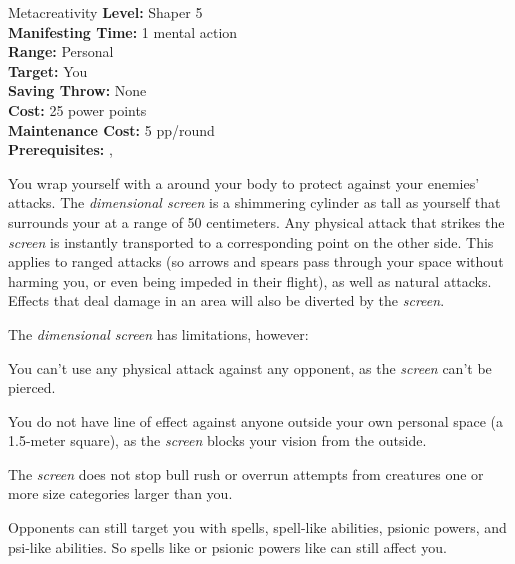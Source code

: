 {Metacreativity}
{
	\textbf{Level:}
	Shaper 5\\
	\textbf{Manifesting Time:}
	1 mental action\\
	\textbf{Range:}
	Personal\\
	\textbf{Target:}
	You\\
	\textbf{Saving Throw:}
	None\\
	\textbf{Cost:}
	25 power points\\
	\textbf{Maintenance Cost:}
	5 pp/round\\
	\textbf{Prerequisites:}
	, \\
}
{
	You wrap yourself with a  around your body to protect against your enemies' attacks. The \emph{dimensional screen} is a shimmering cylinder as tall as yourself that surrounds your at a range of 50 centimeters. Any physical attack that strikes the \emph{screen} is instantly transported to a corresponding point on the other side. This applies to ranged attacks (so arrows and spears pass through your space without harming you, or even being impeded in their flight), as well as natural attacks. Effects that deal damage in an area will also be diverted by the \emph{screen}.

	The \emph{dimensional screen} has limitations, however:
	\begin{itemize*}
		\item You can't use any physical attack against any opponent, as the \emph{screen} can't be pierced.
		\item You do not have line of effect against anyone outside your own personal space (a 1.5-meter square), as the \emph{screen} blocks your vision from the outside.
		\item The \emph{screen} does not stop bull rush or overrun attempts from creatures one or more size categories larger than you.
	\end{itemize*}

	Opponents can still target you with spells, spell-like abilities, psionic powers, and psi-like abilities. So spells like  or psionic powers like  can still affect you.
}